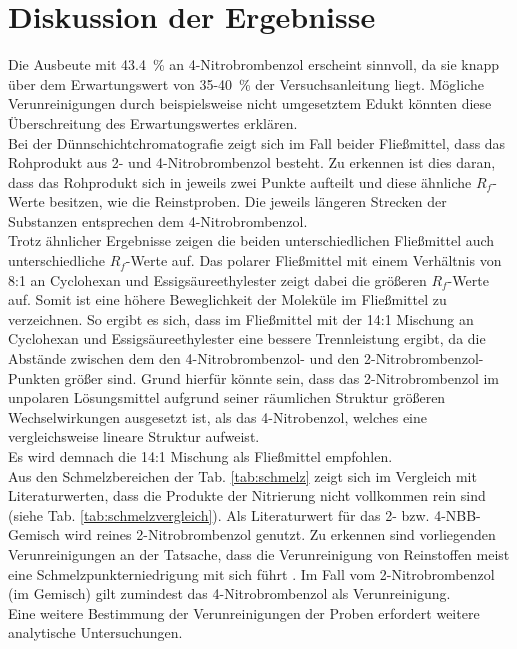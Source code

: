 \newpage
\section{Diskussion der Ergebnisse}
\label{sec:diskussion}

Die Ausbeute mit \SI{43,4}{\percent} an 4-Nitrobrombenzol erscheint sinnvoll, da sie knapp über dem Erwartungswert von 35-\SI{40}{\percent} der Versuchsanleitung liegt. Mögliche Verunreinigungen durch beispielsweise nicht umgesetztem Edukt könnten diese Überschreitung des Erwartungswertes erklären.\\

Bei der Dünnschichtchromatografie zeigt sich im Fall beider Fließmittel, dass das Rohprodukt aus 2- und 4-Nitrobrombenzol besteht. Zu erkennen ist dies daran, dass das Rohprodukt sich in jeweils zwei Punkte aufteilt und diese ähnliche $R_f$-Werte besitzen, wie die Reinstproben. Die jeweils längeren Strecken der Substanzen entsprechen dem 4-Nitrobrombenzol.\\
Trotz ähnlicher Ergebnisse zeigen die beiden unterschiedlichen Fließmittel auch unterschiedliche $R_f$-Werte auf. Das polarer Fließmittel mit einem Verhältnis von 8:1 an Cyclohexan und Essigsäureethylester zeigt dabei die größeren $R_f$-Werte auf. Somit ist eine höhere Beweglichkeit der Moleküle im Fließmittel zu verzeichnen. So ergibt es sich, dass im Fließmittel mit der 14:1 Mischung an Cyclohexan und Essigsäureethylester eine bessere Trennleistung ergibt, da die Abstände zwischen dem den 4-Nitrobrombenzol- und den 2-Nitrobrombenzol-Punkten größer sind. Grund hierfür könnte sein, dass das 2-Nitrobrombenzol im unpolaren Lösungsmittel aufgrund seiner räumlichen Struktur größeren Wechselwirkungen ausgesetzt ist, als das 4-Nitrobenzol, welches eine vergleichsweise lineare Struktur aufweist.\\
Es wird demnach die 14:1 Mischung als Fließmittel empfohlen. \\

Aus den Schmelzbereichen der Tab. \ref{tab:schmelz} zeigt sich im Vergleich mit Literaturwerten, dass die Produkte der Nitrierung nicht vollkommen rein sind (siehe Tab. \ref{tab:schmelzvergleich}). Als Literaturwert für das 2- bzw. 4-NBB-Gemisch wird reines 2-Nitrobrombenzol genutzt. Zu erkennen sind vorliegenden Verunreinigungen an der Tatsache, dass die Verunreinigung von Reinstoffen meist eine Schmelzpunkterniedrigung mit sich führt \cite{ROMPPRedaktion.2002b}. Im Fall vom 2-Nitrobrombenzol (im Gemisch) gilt zumindest das 4-Nitrobrombenzol als Verunreinigung. \\
Eine weitere Bestimmung der Verunreinigungen der Proben erfordert weitere analytische Untersuchungen.

